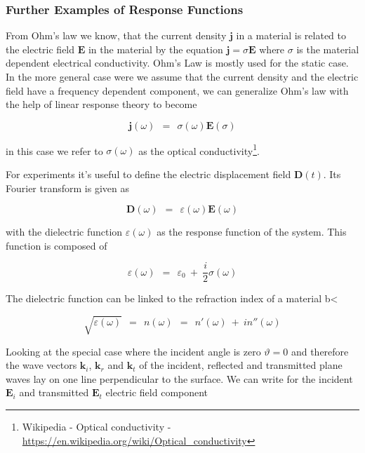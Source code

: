 \documentclass[10pt]{report}
\numberwithin{equation}{chapter}
\newcommand{\vc}[1]{ %
  \mathbf{#1}
}
\begin{document}
\subsubsection{Further Examples of Response Functions}

From Ohm's law we know, that the current density $\vc{j}$ in a material is related to the electric field $\vc{E}$ in the material by the equation $\vc{j} = \sigma \vc{E}$ where $\sigma$ is the material dependent electrical conductivity. Ohm's Law is mostly used for the static case. 
In the more general case were we assume that the current density and the electric field have a frequency dependent component, we can generalize Ohm's law with the help of linear response theory to become

\begin{equation}
  \vc{j}(\omega) ~~=~~ \sigma(\omega) \vc{E}(\sigma)
\end{equation}

in this case we refer to $\sigma(\omega)$ as the optical conductivity\footnote{Wikipedia - Optical conductivity - \url{https://en.wikipedia.org/wiki/Optical_conductivity}}.

For experiments it's useful to define the electric displacement field $\vc{D}(t)$. Its Fourier transform is given as

\begin{equation}
  \vc{D}(\omega) ~~=~~ \varepsilon(\omega) \vc{E}(\omega)
\end{equation}

with the dielectric function $\varepsilon(\omega)$ as the response function of the system. This function is composed of 

\begin{equation}
  \varepsilon(\omega) ~~=~~ \varepsilon_0 ~+~ \frac{i}{2}\sigma(\omega)
\end{equation}

The dielectric function can be linked to the refraction index of a material b<

\begin{equation} \label{eq:refrac_index}
  \sqrt{\varepsilon(\omega)} ~~=~~ n(\omega) ~~=~~ n'(\omega) ~+~ in''(\omega)
\end{equation}


Looking at the special case where the incident angle is zero $\vartheta = 0$ and therefore the wave vectors $\vc{k}_i$, $\vc{k}_r$ and $\vc{k}_t$ of the incident, reflected and transmitted plane waves lay on one line perpendicular to the surface. We can write for the incident $\vc{E}_i$ and transmitted $\vc{E}_t$ electric field component
\end{document}
